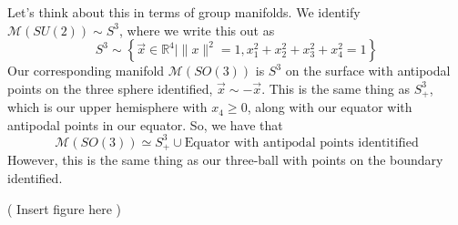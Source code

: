  Let's think about this in terms of group manifolds. 
 We identify $\mathcal{ M } ( SU ( 2) ) \sim S^ 3 $, where we write this out as 
 \[S^ 3 \sim \left\{  \vec{x} \in \mathbb{ R}  ^ 4 \mid  \| x \| ^ 2 = 1 , x_1^ 2 + x_2 ^ 2 + x_3 ^ 2 + x_4 ^ 2 = 1  \right\} 
\] Our corresponding manifold $ \mathcal{ M } ( SO ( 3) ) $ is $ S^ 3 $ on the surface 
with antipodal points on the three sphere identified, $ \vec{x} \sim  - \vec{x}$. 
This is the same thing as $ S^ 3 _ +  $, which is our upper hemisphere with $ x_4 \geq 0 $, 
along with our equator with antipodal points in our equator. So, we have that
\[
	\mathcal{ M } ( SO ( 3) ) \simeq S^3 _ + \cup \text{Equator with antipodal points identitified} 
\] 
 However, this is the same thing as our three-ball with points on
the boundary identified.

( Insert figure here ) 





\pagebreak 
